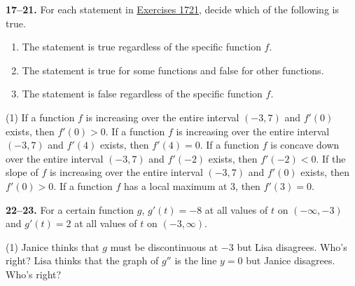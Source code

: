 \documentclass[10pt,oneside,]{book}
\newcommand{\lt}{<}
\newcommand{\gt}{>}
\theoremstyle{plain}
\theoremstyle{definition}
\numberwithin{equation}{section}
\newcommand{\fe}[2]{#1\mathopen{}\left(#2\right)\mathclose{}}
\newcommand{\ointerval}[2]{\left(#1,#2\right)}
\newcommand{\fd}[1]{#1'}
\newcommand{\sd}[1]{#1''}
\begin{document}
\textbf{17--21. }\hypertarget{exercisegroup-66}{\null}For each statement in \hyperlink{exercise-function-statement-first}{Exercises 17}\textendash{}\hyperlink{exercise-function-statement-last}{21}, decide which of the following is true. %
\begin{multicols}{3}
\begin{enumerate}[label=(\alph*)]
\item{}The statement is true regardless of the specific function \(f\).\item{}The statement is true for some functions and false for other functions. \item{}The statement is false regardless of the specific function \(f\).\end{enumerate}
\end{multicols}
\par
\begin{exercisegroup}(1)
\exercise[17.]\hypertarget{exercise-function-statement-first}{\null}If a function \(f\) is increasing over the entire interval \(\ointerval{-3}{7}\) and \(\fe{\fd{f}}{0}\) exists, then \(\fe{\fd{f}}{0}\gt0\).%
\exercise[18.]\hypertarget{exercise-315}{\null}If a function \(f\) is increasing over the entire interval \(\ointerval{-3}{7}\) and \(\fe{\fd{f}}{4}\) exists, then \(\fe{\fd{f}}{4}=0\).%
\exercise[19.]\hypertarget{exercise-316}{\null}If a function \(f\) is concave down over the entire interval \(\ointerval{-3}{7}\) and \(\fe{\fd{f}}{-2}\) exists, then \(\fe{\fd{f}}{-2}\lt0\).%
\exercise[20.]\hypertarget{exercise-317}{\null}If the slope of \(f\) is increasing over the entire interval \(\ointerval{-3}{7}\) and \(\fe{\fd{f}}{0}\) exists, then \(\fe{\fd{f}}{0}\gt0\).%
\exercise[21.]\hypertarget{exercise-function-statement-last}{\null}If a function \(f\) has a local maximum at \(3\), then \(\fe{\fd{f}}{3}=0\).%
\end{exercisegroup}
\par\smallskip\noindent
\textbf{22--23. }\hypertarget{exercisegroup-67}{\null}For a certain function \(g\), \(\fe{\fd{g}}{t}=-8\) at all values of \(t\) on \(\ointerval{-\infty}{-3}\) and \(\fe{\fd{g}}{t}=2\) at all values of \(t\) on \(\ointerval{-3}{\infty}\).%
\par
\begin{exercisegroup}(1)
\exercise[22.]\hypertarget{exercise-319}{\null}Janice thinks that \(g\) must be discontinuous at \(-3\) but Lisa disagrees.  Who's right?%
\exercise[23.]\hypertarget{exercise-320}{\null}Lisa thinks that the graph of \(\sd{g}\) is the line \(y=0\) but Janice disagrees.  Who's right?%
\end{exercisegroup}
\end{document}
